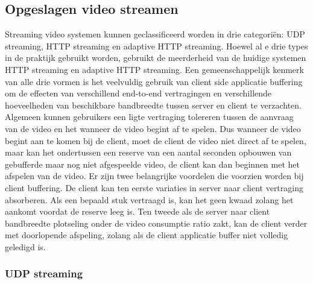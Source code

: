 \subsection{Opgeslagen video streamen}

Streaming video systemen kunnen geclassificeerd worden in drie categoriën: UDP streaming, HTTP streaming en adaptive HTTP streaming. Hoewel al e drie types in de praktijk gebruikt worden, gebruikt de meerderheid van de huidige systemen HTTP streaming en adaptive HTTP streaming.
Een gemeenschappelijk kenmerk van alle drie vormen is het veelvuldig gebruik van client side applicatie buffering om de effecten van verschillend end-to-end vertragingen en verschillende hoeveelheden van beschikbare bandbreedte tussen server en client te verzachten.
Algemeen kunnen gebruikers een ligte vertraging tolereren tussen de aanvraag van de video en het wanneer de video begint af te spelen. Dus wanneer de video begint aan te komen bij de client, moet de client de video niet direct af te spelen, maar kan het ondertussen een reserve van een aantal seconden opbouwen van gebufferde maar nog niet afgespeelde video, de client kan dan beginnen met het afspelen van de video. Er zijn twee belangrijke voordelen die voorzien worden bij client buffering. De client kan ten eerste variaties in server naar client vertraging absorberen. Als een bepaald stuk vertraagd is, kan het geen kwaad zolang het aankomt voordat de reserve leeg is. Ten tweede als de server naar client bandbreedte plotseling onder de video consumptie ratio zakt, kan de client verder met doorlopende afspeling, zolang als de client applicatie buffer niet volledig geledigd is.

\subsubsection{UDP streaming}

